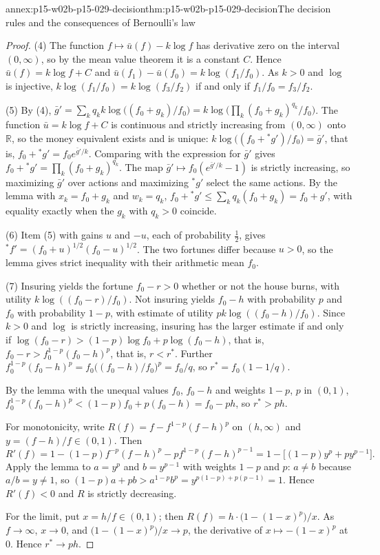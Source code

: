 \begin{annexitem}{annex:p15-w02b-p15-029-decision}{thm:p15-w02b-p15-029-decision}{The decision rules and the consequences of Bernoulli's law}
\begin{proof}
(4) The function \(f\mapsto\bar u(f)-k\log f\) has derivative zero on
the interval \((0,\infty)\), so by the mean value theorem it is a
constant \(C\). Hence \(\bar u(f)=k\log f+C\) and
\(\bar u(f_1)-\bar u(f_0)=k\log(f_1/f_0)\). As \(k>0\) and \(\log\)
is injective, \(k\log(f_1/f_0)=k\log(f_3/f_2)\) if and only if
\(f_1/f_0=f_3/f_2\).

(5) By (4),
\(\bar g'=\sum_kq_kk\log\bigl((f_0+g_k)/f_0\bigr)
 =k\log\bigl(\prod_k(f_0+g_k)^{q_k}/f_0\bigr)\).
The function \(\bar u=k\log f+C\) is continuous and strictly increasing
from \((0,\infty)\) onto \(\mathbb R\), so the money equivalent exists
and is unique: \(k\log\bigl((f_0+{}^*g')/f_0\bigr)=\bar g'\), that is,
\(f_0+{}^*g'=f_0e^{\bar g'/k}\). Comparing with the expression for
\(\bar g'\) gives \(f_0+{}^*g'=\prod_k(f_0+g_k)^{q_k}\). The map
\(\bar g'\mapsto f_0(e^{\bar g'/k}-1)\) is strictly increasing, so
maximizing \(\bar g'\) over actions and maximizing \({}^*g'\) select the
same actions. By the lemma with \(x_k=f_0+g_k\) and \(w_k=q_k\),
\(f_0+{}^*g'\leq\sum_kq_k(f_0+g_k)=f_0+g'\), with equality exactly when
the \(g_k\) with \(q_k>0\) coincide.

(6) Item (5) with gains \(u\) and \(-u\), each of probability
\(\tfrac12\), gives \({}^*f'=(f_0+u)^{1/2}(f_0-u)^{1/2}\). The two
fortunes differ because \(u>0\), so the lemma gives strict inequality
with their arithmetic mean \(f_0\).

(7) Insuring yields the fortune \(f_0-r>0\) whether or not the house
burns, with utility \(k\log((f_0-r)/f_0)\). Not insuring yields
\(f_0-h\) with probability \(p\) and \(f_0\) with probability \(1-p\),
with estimate of utility \(pk\log((f_0-h)/f_0)\). Since \(k>0\) and
\(\log\) is strictly increasing, insuring has the larger estimate if and
only if
\(\log(f_0-r)>(1-p)\log f_0+p\log(f_0-h)\), that is,
\(f_0-r>f_0^{1-p}(f_0-h)^p\), that is, \(r<r^*\). Further
\(f_0^{1-p}(f_0-h)^p=f_0\bigl((f_0-h)/f_0\bigr)^p=f_0/q\), so
\(r^*=f_0(1-1/q)\).

By the lemma with the unequal values \(f_0\), \(f_0-h\) and weights
\(1-p\), \(p\) in \((0,1)\),
\(f_0^{1-p}(f_0-h)^p<(1-p)f_0+p(f_0-h)=f_0-ph\), so \(r^*>ph\).

For monotonicity, write \(R(f)=f-f^{1-p}(f-h)^p\) on \((h,\infty)\)
and \(y=(f-h)/f\in(0,1)\). Then
\[
 R'(f)=1-(1-p)f^{-p}(f-h)^p-pf^{1-p}(f-h)^{p-1}=1-\bigl[(1-p)y^p+py^{p-1}\bigr].
\]
Apply the lemma to \(a=y^p\) and \(b=y^{p-1}\) with weights \(1-p\)
and \(p\): \(a\ne b\) because \(a/b=y\ne1\), so
\((1-p)a+pb>a^{1-p}b^p=y^{p(1-p)+p(p-1)}=1\). Hence \(R'(f)<0\) and
\(R\) is strictly decreasing.

For the limit, put \(x=h/f\in(0,1)\); then
\(R(f)=h\cdot\bigl(1-(1-x)^p\bigr)/x\). As \(f\to\infty\), \(x\to0\),
and \(\bigl(1-(1-x)^p\bigr)/x\to p\), the derivative of
\(x\mapsto-(1-x)^p\) at \(0\). Hence \(r^*\to ph\).
\end{proof}
\end{annexitem}

